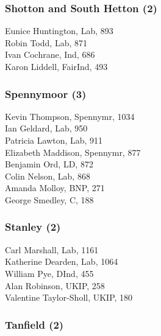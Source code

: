 \documentclass[a4paper,openany,10pt]{book}
\begin{document}
\subsubsection*{Shotton and South Hetton (2)}



Eunice Huntington, Lab, 893\\
Robin Todd, Lab, 871\\
Ivan Cochrane, Ind, 686\\
Karon Liddell, FairInd, 493\\


\subsubsection*{Spennymoor (3)}



Kevin Thompson, Spennymr, 1034\\
Ian Geldard, Lab, 950\\
Patricia Lawton, Lab, 911\\
Elizabeth Maddison, Spennymr, 877\\
Benjamin Ord, LD, 872\\
Colin Nelson, Lab, 868\\
Amanda Molloy, BNP, 271\\
George Smedley, C, 188\\


\subsubsection*{Stanley (2)}



Carl Marshall, Lab, 1161\\
Katherine Dearden, Lab, 1064\\
William Pye, DInd, 455\\
Alan Robinson, UKIP, 258\\
Valentine Taylor-Sholl, UKIP, 180\\


\subsubsection*{Tanfield (2)}

\end{document}
